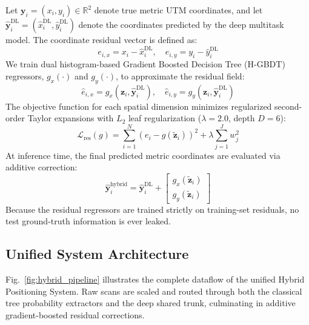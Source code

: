 Let $\mathbf{y}_i = (x_i, y_i) \in \mathbb{R}^2$ denote true metric UTM coordinates, and let $\hat{\mathbf{y}}_i^{\text{DL}} = (\hat{x}_i^{\text{DL}}, \hat{y}_i^{\text{DL}})$ denote the coordinates predicted by the deep multitask model. The coordinate residual vector is defined as:
\begin{equation}
\label{eq:residuals}
e_{i,x} = x_i - \hat{x}_i^{\text{DL}}, \quad e_{i,y} = y_i - \hat{y}_i^{\text{DL}}
\end{equation}
We train dual histogram-based Gradient Boosted Decision Tree (H-GBDT) regressors, $g_x(\cdot)$ and $g_y(\cdot)$, to approximate the residual field:
\begin{equation}
\hat{e}_{i,x} = g_x(\mathbf{z}_i, \hat{\mathbf{y}}_i^{\text{DL}}), \quad
\hat{e}_{i,y} = g_y(\mathbf{z}_i, \hat{\mathbf{y}}_i^{\text{DL}})
\end{equation}
The objective function for each spatial dimension minimizes regularized second-order Taylor expansions with $L_2$ leaf regularization ($\lambda=2.0$, depth $D=6$):
\begin{equation}
\mathcal{L}_{\text{res}}(g) = \sum_{i=1}^N \left( e_i - g(\tilde{\mathbf{z}}_i) \right)^2 + \lambda \sum_{j=1}^J w_j^2
\end{equation}
At inference time, the final predicted metric coordinates are evaluated via additive correction:
\begin{equation}
\label{eq:hybrid-coord-inference}
\hat{\mathbf{y}}_i^{\text{hybrid}} = \hat{\mathbf{y}}_i^{\text{DL}} + \begin{bmatrix} g_x(\tilde{\mathbf{z}}_i) \\ g_y(\tilde{\mathbf{z}}_i) \end{bmatrix}
\end{equation}
Because the residual regressors are trained strictly on training-set residuals, no test ground-truth information is ever leaked.

\subsection{Unified System Architecture}

Fig.~\ref{fig:hybrid_pipeline} illustrates the complete dataflow of the unified Hybrid Positioning System. Raw scans are scaled and routed through both the classical tree probability extractors and the deep shared trunk, culminating in additive gradient-boosted residual corrections.

